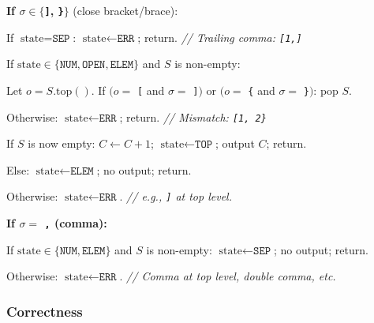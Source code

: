 \documentclass[11pt]{article}
\begin{document}
\begin{compactenum}
\item \textbf{If $\sigma \in \{$\texttt{]}, \texttt{\}}$\}$} (close bracket/brace):
  \begin{compactitem}
  \item If $\text{state} = \texttt{SEP}$: $\text{state} \leftarrow \texttt{ERR}$; return. \quad \textit{// Trailing comma: \texttt{[1,]}}
  \item If $\text{state} \in \{\texttt{NUM}, \texttt{OPEN}, \texttt{ELEM}\}$ and $S$ is non-empty:
    \begin{compactitem}
    \item Let $o = S.\text{top}()$. If $(o = $ \texttt{[} and $\sigma = $ \texttt{]}$)$ or $(o = $ \texttt{\{} and $\sigma = $ \texttt{\}}$)$: pop $S$.
    \item Otherwise: $\text{state} \leftarrow \texttt{ERR}$; return. \quad \textit{// Mismatch: \texttt{[1, 2\}}}
    \item If $S$ is now empty: $C \leftarrow C+1$; $\text{state} \leftarrow \texttt{TOP}$; output $C$; return.
    \item Else: $\text{state} \leftarrow \texttt{ELEM}$; no output; return.
    \end{compactitem}
  \item Otherwise: $\text{state} \leftarrow \texttt{ERR}$. \quad \textit{// e.g., \texttt{]} at top level.}
  \end{compactitem}

\item \textbf{If $\sigma = $ \texttt{,} (comma):}
  \begin{compactitem}
  \item If $\text{state} \in \{\texttt{NUM}, \texttt{ELEM}\}$ and $S$ is non-empty: $\text{state} \leftarrow \texttt{SEP}$; no output; return.
  \item Otherwise: $\text{state} \leftarrow \texttt{ERR}$. \quad \textit{// Comma at top level, double comma, etc.}
  \end{compactitem}

\end{compactenum}

\subsubsection*{Correctness}
\end{document}
